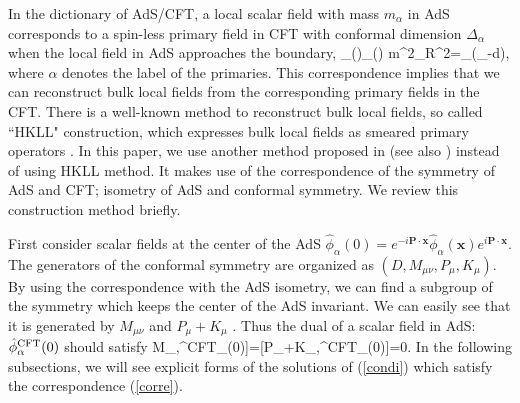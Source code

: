 \documentclass[11pt,a4paper]{article}
\def\a{{\alpha}}
\def\CO{{\cal O}}
\def\bal#1\eal{\begin{align}#1\end{align}}
\def\LR{\Leftrightarrow}
\def\qq{\quad\quad}
\begin{document}
In the dictionary of AdS/CFT, a local scalar field with mass $m_\a$ in AdS corresponds to a spin-less primary field in CFT with conformal dimension $\Delta_\a$ when the local field in AdS approaches the boundary,
\bal
\phi_\a()\LR \CO_\a()\qq
m^2_\a R^2=\Delta_\a(\Delta_\a-d),\label{corre}
\eal
where $\a$ denotes the label of the primaries. This correspondence implies that we can reconstruct bulk local fields from the corresponding primary fields in the CFT. There is a well-known method to reconstruct bulk local fields, so called ``HKLL" construction, which expresses bulk local fields as smeared primary operators \cite{HKLL0}\cite{HKLL1}\cite{HKLL2}. In this paper, we use another method proposed in \cite{cMERA}\cite{NO} (see also \cite{Wan}\cite{Ver}\cite{GMT}) 
instead of using HKLL method. It makes use of the correspondence of the symmetry of AdS and CFT;  isometry of AdS and conformal symmetry. We review this construction method briefly.


First consider scalar fields at the center of the AdS $\hat{\phi}_\a(0)=e^{-i\boldsymbol{P}\cdot\boldsymbol{x}}\hat{\phi}_\a(\boldsymbol{x})e^{i\boldsymbol{P}\cdot\boldsymbol{x}}$. The generators of the conformal symmetry are organized as $(D,M_{\mu\nu},P_\mu,K_\mu)$. By using the correspondence with the AdS isometry, we can find a subgroup of the symmetry which keeps the center of the AdS invariant. We can easily see that it is generated by $M_{\mu\nu}$ and $P_{\mu}+K_{\mu}$  \cite{cMERA}\cite{NO}. Thus the dual of a scalar field in AdS: $\hat{\phi}^{\rm CFT}_\a(0)$ should satisfy
\bal
[M_{\mu\nu},\hat{\phi}^{\rm CFT}_\a(0)]=[P_{\mu}+K_{\mu},\hat{\phi}^{\rm CFT}_\a(0)]=0.\label{condi}
\eal
In the following subsections, we will see explicit forms of the solutions  of (\ref{condi}) which satisfy the correspondence (\ref{corre}).
\end{document}
